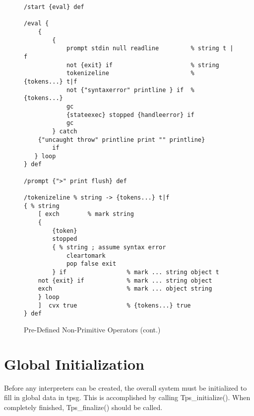 \begin{figure}[p]\centering
\begin{verbatim}
/start {eval} def

/eval {
    {
        {
            prompt stdin null readline         % string t | f
            not {exit} if                      % string
            tokenizeline                       % {tokens...} t|f
            not {"syntaxerror" printline } if  % {tokens...}
            gc
            {stateexec} stopped {handleerror} if
            gc
        } catch
    {"uncaught throw" printline print "" printline}
        if
   } loop
} def

/prompt {">" print flush} def

/tokenizeline % string -> {tokens...} t|f
{ % string
    [ exch        % mark string
    {
        {token}
        stopped
        { % string ; assume syntax error
            cleartomark
            pop false exit
        } if                 % mark ... string object t
    not {exit} if            % mark ... string object
    exch                     % mark ... object string
    } loop
    ]  cvx true              % {tokens...} true
} def
\end{verbatim}
\caption{Pre-Defined Non-Primitive Operators (cont.)}
\label{nonprimb}
\end{figure}
\clearpage

\section{Global Initialization}
Before any interpreters can be created,
the overall system must be initialized to
fill in global data in tpsg.
This is accomplished by calling Tps\_initialize().
When completely finished, Tps\_finalize() should be called.

